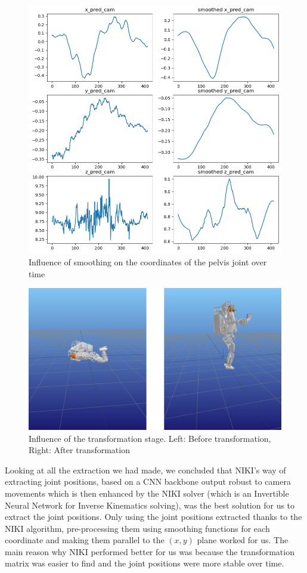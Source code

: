 \documentclass{amsart}
\theoremstyle{definition}
\theoremstyle{plain}
\begin{document}
\begin{figure}
  \includegraphics[width = 0.5 \columnwidth]{img/influence_of_smoothing.png}
  \caption{Influence of smoothing on the coordinates of the pelvis joint over time}\label{fig:influence_of_smoothing}
\end{figure}
\begin{figure}
  \includegraphics[width = 0.75 \columnwidth]{img/influence_transformation.png}
  \caption{Influence of the transformation stage. Left: Before transformation, Right: After transformation}\label{fig:influence_transformation}
\end{figure}

Looking at all the extraction we had made, we concluded that NIKI's way of extracting joint positions, 
based on a CNN backbone output robust to camera movements which is then enhanced by the NIKI solver (which is an Invertible Neural Network for Inverse Kinematics solving), 
was the best solution for us to extract the joint positions. 
Only using the joint positions extracted thanks to the NIKI algorithm, pre-processing them using smoothing functions for each coordinate and making them parallel to the $(x, y)$ plane worked for us. 
The main reason why NIKI performed better for us was because the transformation matrix was easier to find and the joint positions were more stable over time.
\end{document}
